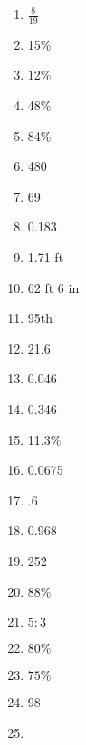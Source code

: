 \documentclass[../uilmath.tex]{subfiles}
\begin{document}
\begin{enumerate}[label=\bfseries\arabic*.]
    \item %
    $\frac{8}{19}$

    \item %
    15\%

    \item %
    12\%

    \item %
    48\%

    \item %
    84\%

    \item %
    480

    \item %
    69

    \item %
    0.183 

    \item %
    1.71 ft 

    \item %
    62 ft 6 in 

    \item %
    95th

    \item %
    21.6

    \item %
    0.046

    \item %
    0.346

    \item %
    11.3\%

    \item %
    0.0675

    \item %
    .6

    \item %
    0.968

    \item %
    252

    \item %
    88\%

    \item %
    $5:3$

    \item %
    $80\%$

    \item %
    $75\%$

    \item %
    98

    \item %
    
\end{enumerate}
\end{document}

